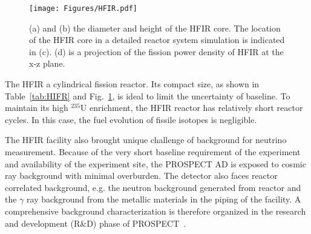 \begin{figure}
    \centering
    \texttt{[image: Figures/HFIR.pdf]}
    \caption[The dimensions and power distribution of HFIR]{(a) and (b) the diameter and height of the HFIR core.
    The location of the HFIR core in a detailed reactor system simulation is indicated in (c).
    (d) is a projection of the fission power density of HFIR at the x-z plane.}
    \label{fig:HFIR}
\end{figure}

    The HFIR a cylindrical fission reactor.
    Its compact size, as shown in Table~\ref{tab:HIFR} and Fig.~\ref{fig:HFIR}, is ideal to limit the uncertainty of baseline.
    To maintain its high $^{235}$U enrichment, the HFIR reactor has relatively short reactor cycles.
    In this case, the fuel evolution of fissile isotopes is negligible.
    
    The HFIR facility also brought unique challenge of background for neutrino measurement. 
    Because of the very short baseline requirement of the experiment and availability of the experiment site, the PROSPECT AD is exposed to cosmic ray background with minimal overburden. 
    The detector also faces reactor correlated background, e.g. the neutron background generated from reactor and the $\gamma$ ray background from the metallic materials in the piping of the facility.
    A comprehensive background characterization is therefore organized in the research and development (R\&D) phase of PROSPECT~\cite{bib:prospect_background}. 
    





